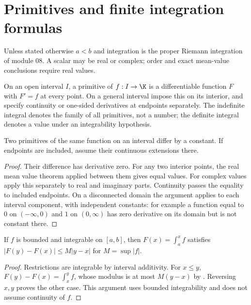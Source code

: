 \chapter{Primitives and finite integration formulas}
Unless stated otherwise $a<b$ and integration is the proper Riemann
integration of module 08. A scalar may be real or complex; order and exact
mean-value conclusions require real values.

\begin{definition}
On an open interval $I$, a primitive of $f:I\to\K$ is a differentiable
function $F$ with $F'=f$ at every point. On a general interval impose
this on its interior, and specify continuity or one-sided derivatives at
endpoints separately. The indefinite integral denotes the family of all
primitives, not a number; the definite integral denotes a value under an
integrability hypothesis.
\end{definition}

\begin{theorem}
Two primitives of the same function on an interval differ by a constant.
If endpoints are included, assume their continuous extensions there.
\end{theorem}
\begin{proof}
Their difference has derivative zero. For any two interior points, the
real mean value theorem applied between them gives equal values.
For complex values apply this separately to real and imaginary parts.
Continuity passes the equality to included endpoints. On a disconnected
domain the argument applies to each interval component, with independent
constants: for example a function equal to $0$ on $(-\infty,0)$ and $1$
on $(0,\infty)$ has zero derivative on its domain but is not constant there.
\end{proof}

\begin{theorem}
If $f$ is bounded and integrable on $[a,b]$, then
$F(x)=\int_a^xf$ satisfies
$|F(y)-F(x)|\le M|y-x|$ for $M=\sup|f|$.
\end{theorem}
\begin{proof}
Restrictions are integrable by interval additivity. For $x\le y$,
$F(y)-F(x)=\int_x^yf$, whose modulus is at most $M(y-x)$ by
. Reversing $x,y$ proves the other case. This
argument uses bounded integrability and does not assume continuity of $f$.
\end{proof}

